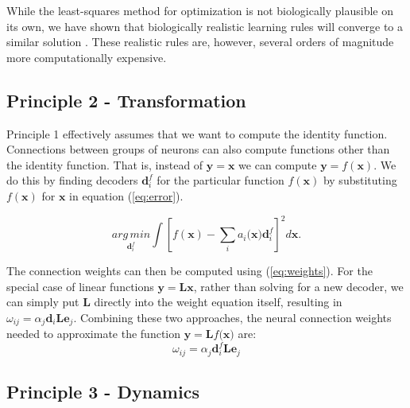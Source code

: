 \documentclass[english]{article}
\begin{document}
While the least-squares method for optimization is not
biologically plausible on its own, we have shown that biologically
realistic learning rules will converge to a similar solution \cite{MacNeil2011a}.
These realistic rules are, however, several orders of magnitude more
computationally expensive.

\subsection{Principle 2 - Transformation}

Principle 1 effectively assumes that we want to compute the identity function. Connections between groups of neurons can also compute functions other
than the identity function. That is, instead of \textbf{$\mathbf{y}=\mathbf{x}$}
we can compute \textbf{$\mathbf{y}=f(\mathbf{x})$}. We do this by finding
decoders \textbf{$\mathbf{d}_{i}^{f}$ }for the particular function\textbf{
$f(\mathbf{x})$} by substituting \textbf{$f(\mathbf{x})$ }for $\mathbf{x}$
in equation (\ref{eq:error}).

\begin{equation}
\underset{\mathbf{d}_{i}^{f}}{arg\, min}\int[f(\mathbf{x})-\sum_{i}a_{i}(\mathbf{x)}\mathbf{d}_{i}^{f}]^{2}d\mathbf{x}.\label{eq:error-fcns}
\end{equation}

The connection weights can then be computed using (\ref{eq:weights}).
For the special case of linear functions\textbf{ $\mathbf{y}=\mathbf{L}\mathbf{x}$},
rather than solving for a new decoder, we can simply put $\mathbf{L}$
directly into the weight equation itself, resulting in $\omega_{ij}=\alpha_{j}\mathbf{d}_{i}\mathbf{L}\mathbf{e}_{j}$.
Combining these two approaches, the neural connection weights needed
to approximate the function\textbf{ $\mathbf{y=L}f(\mathbf{x\textrm{)}}$}
are:
\begin{equation}
\omega_{ij}=\alpha_{j}\mathbf{d}_{i}^{f}\mathbf{L}\mathbf{e}_{j}\label{eq:weights-general}
\end{equation}


\subsection{\label{sub:Principle-3--}Principle 3 - Dynamics}
\end{document}
